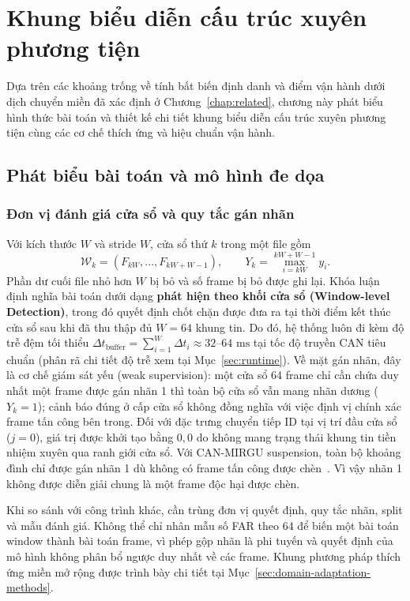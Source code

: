 \documentclass[12pt, a4paper, reqno, oneside]{book}
\begin{document}
\chapter{Khung biểu diễn cấu trúc xuyên phương tiện}\label{chap:method}
Dựa trên các khoảng trống về tính bất biến định danh và điểm vận hành dưới dịch chuyển miền đã xác định ở Chương~\ref{chap:related}, chương này phát biểu hình thức bài toán và thiết kế chi tiết khung biểu diễn cấu trúc xuyên phương tiện cùng các cơ chế thích ứng và hiệu chuẩn vận hành.

\section{Phát biểu bài toán và mô hình đe dọa}
\subsection{Đơn vị đánh giá cửa sổ và quy tắc gán nhãn}
Với kích thước $W$ và stride $W$, cửa sổ thứ $k$ trong một file gồm
\begin{equation}
\mathcal{W}_k=(F_{kW},\ldots,F_{kW+W-1}),\qquad Y_k=\max_{i=kW}^{kW+W-1}y_i.
\end{equation}
Phần dư cuối file nhỏ hơn $W$ bị bỏ và số frame bị bỏ được ghi lại. Khóa luận định nghĩa bài toán dưới dạng \textbf{phát hiện theo khối cửa sổ (Window-level Detection)}, trong đó quyết định chốt chặn được đưa ra tại thời điểm kết thúc cửa sổ sau khi đã thu thập đủ $W=64$ khung tin. Do đó, hệ thống luôn đi kèm độ trễ đệm tối thiểu $\Delta t_{\text{buffer}} = \sum_{i=1}^{W} \Delta t_i \approx 32\text{--}64\text{ ms}$ tại tốc độ truyền CAN tiêu chuẩn (phân rã chi tiết độ trễ xem tại Mục~\ref{sec:runtime}). Về mặt gán nhãn, đây là cơ chế giám sát yếu (weak supervision): một cửa sổ 64 frame chỉ cần chứa duy nhất một frame được gán nhãn 1 thì toàn bộ cửa sổ vẫn mang nhãn dương ($Y_k=1$); cảnh báo đúng ở cấp cửa sổ không đồng nghĩa với việc định vị chính xác frame tấn công bên trong. Đối với đặc trưng chuyển tiếp ID tại vị trí đầu cửa sổ ($j=0$), giá trị được khởi tạo bằng $0{,}0$ do không mang trạng thái khung tin tiền nhiệm xuyên qua ranh giới cửa sổ. Với CAN-MIRGU suspension, toàn bộ khoảng đình chỉ được gán nhãn 1 dù không có frame tấn công được chèn~\cite{rajapaksha2024canmirgu}. Vì vậy nhãn 1 không được diễn giải chung là một frame độc hại được chèn.

Khi so sánh với công trình khác, cần trùng đơn vị quyết định, quy tắc nhãn, split và mẫu đánh giá. Không thể chỉ nhân mẫu số FAR theo 64 để biến một bài toán window thành bài toán frame, vì phép gộp nhãn là phi tuyến và quyết định của mô hình không phân bổ ngược duy nhất về các frame. Khung phương pháp thích ứng miền mở rộng được trình bày chi tiết tại Mục~\ref{sec:domain-adaptation-methods}.
\end{document}
